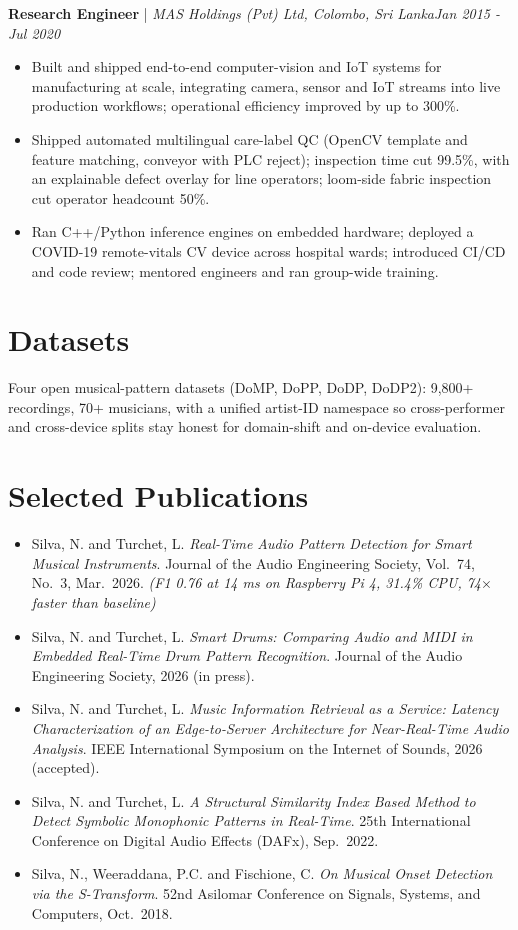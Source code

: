 \documentclass[11pt]{article}
\newenvironment{cvrole}[5]{%
  \par\noindent\textbf{\large #1} | \textit{\small #2, #3}\hfill \textit{\small #4 - #5}\par
  \begin{itemize}[leftmargin=2em, itemsep=-0.3em, topsep=-0.5em]%
}{%
  \end{itemize}\par\noindent\mbox{}\par\vspace{0.1em}%
}
\begin{document}
\begin{cvrole}{Research Engineer}{MAS Holdings (Pvt) Ltd}{Colombo, Sri Lanka}{Jan 2015}{Jul 2020}
    \item Built and shipped end-to-end computer-vision and IoT systems for manufacturing at scale, integrating camera, sensor and IoT streams into live production workflows; operational efficiency improved by up to 300\%.
    \item Shipped automated multilingual care-label QC (OpenCV template and feature matching, conveyor with PLC reject); inspection time cut 99.5\%, with an explainable defect overlay for line operators; loom-side fabric inspection cut operator headcount 50\%.
    \item Ran C++/Python inference engines on embedded hardware; deployed a COVID-19 remote-vitals CV device across hospital wards; introduced CI/CD and code review; mentored engineers and ran group-wide training.
\end{cvrole}

\section*{Datasets \footnotesize {}}
Four open musical-pattern datasets (DoMP, DoPP, DoDP, DoDP2): 9,800+ recordings, 70+ musicians, with a unified artist-ID namespace so cross-performer and cross-device splits stay honest for domain-shift and on-device evaluation.

\section*{Selected Publications \footnotesize {}}
\begin{itemize}[leftmargin=1.2em, itemsep=-0.25em]
    \item Silva, N. and Turchet, L. \textit{Real-Time Audio Pattern Detection for Smart Musical Instruments}. Journal of the Audio Engineering Society, Vol.~74, No.~3, Mar.~2026. \textit{(F1 0.76 at 14 ms on Raspberry Pi 4, 31.4\% CPU, 74$\times$ faster than baseline)}
    \item Silva, N. and Turchet, L. \textit{Smart Drums: Comparing Audio and MIDI in Embedded Real-Time Drum Pattern Recognition}. Journal of the Audio Engineering Society, 2026 (in press).
    \item Silva, N. and Turchet, L. \textit{Music Information Retrieval as a Service: Latency Characterization of an Edge-to-Server Architecture for Near-Real-Time Audio Analysis}. IEEE International Symposium on the Internet of Sounds, 2026 (accepted).
    \item Silva, N. and Turchet, L. \textit{A Structural Similarity Index Based Method to Detect Symbolic Monophonic Patterns in Real-Time}. 25th International Conference on Digital Audio Effects (DAFx), Sep.~2022.
    \item Silva, N., Weeraddana, P.C. and Fischione, C. \textit{On Musical Onset Detection via the S-Transform}. 52nd Asilomar Conference on Signals, Systems, and Computers, Oct.~2018.
\end{itemize}
\end{document}
